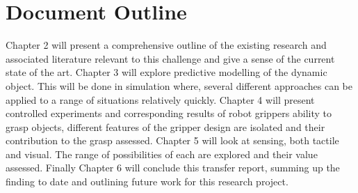 




\section{Document Outline}
Chapter 2 will present a comprehensive outline of the existing research and associated literature relevant to this challenge and give a sense of the current state of the art. Chapter 3 will explore predictive modelling of the dynamic object. This will be done in simulation where, several different approaches can be applied to a range of situations relatively quickly. Chapter 4 will present controlled experiments and corresponding results of robot grippers ability to grasp objects, different features of the gripper design are isolated and their contribution to the grasp assessed. Chapter 5 will look at sensing, both tactile and visual. The range of possibilities of each are explored and their value assessed. Finally Chapter 6 will conclude this transfer report, summing up the finding to date and outlining future work for this research project.



